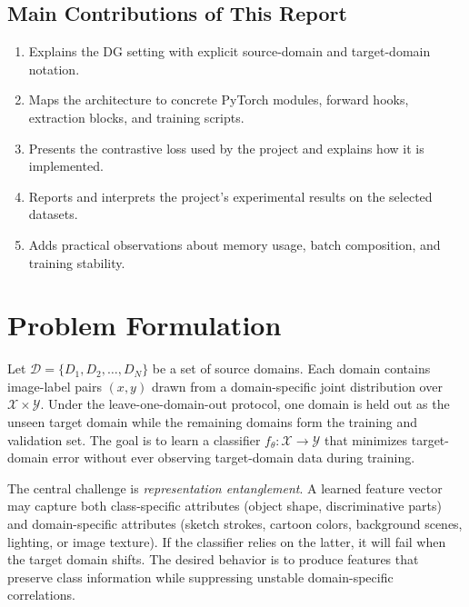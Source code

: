 \documentclass[11pt,a4paper]{article}
\begin{document}
\subsection{Main Contributions of This Report}

\begin{enumerate}[leftmargin=1.6em]
  \item Explains the DG setting with explicit source-domain and target-domain
        notation.
  \item Maps the architecture to concrete PyTorch modules, forward
        hooks, extraction blocks, and training scripts.
  \item Presents the contrastive loss used by the project and explains how it is
        implemented.
  \item Reports and interprets the project's experimental results on the selected
        datasets.
  \item Adds practical observations about memory usage, batch composition, and
        training stability.
\end{enumerate}


\section{Problem Formulation}

Let $\mathcal{D} = \{D_1, D_2, \ldots, D_N\}$ be a set of source domains.
Each domain contains image-label pairs $(x,y)$ drawn from a domain-specific joint
distribution over $\mathcal{X} \times \mathcal{Y}$.  Under the
leave-one-domain-out protocol, one domain is held out as the unseen target domain
while the remaining domains form the training and validation set.  The goal is to
learn a classifier $f_\theta: \mathcal{X} \rightarrow \mathcal{Y}$ that minimizes
target-domain error without ever observing target-domain data during training.

The central challenge is \emph{representation entanglement}.  A learned feature
vector may capture both class-specific attributes (object shape, discriminative
parts) and domain-specific attributes (sketch strokes, cartoon colors, background
scenes, lighting, or image texture).  If the classifier relies on the latter, it
will fail when the target domain shifts.  The desired behavior is to produce
features that preserve class information while suppressing unstable
domain-specific correlations.

\end{document}
